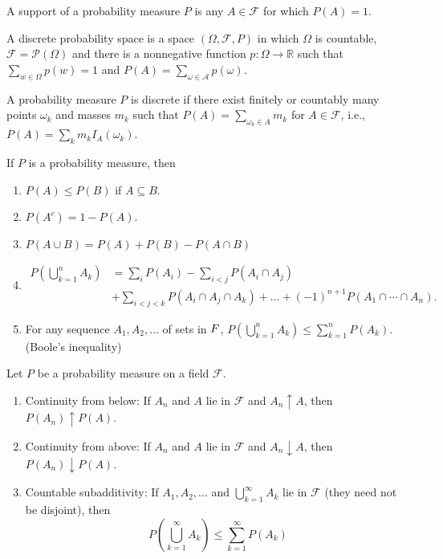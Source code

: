 \documentclass[11pt]{article}
\newcommand{\R}{\mathbb{R}}
\newcommand{\F}{\mathcal{F}}
\newcommand{\A}{\mathcal{A}}
\newcommand{\seq}{\subseteq}
\newcommand{\mc}{\mathcal}
\newcommand{\un}{\cup}
\newcommand{\ic}{\cap}
\newenvironment{theorem}[2][Theorem]{\begin{trivlist}
\item[\hskip \labelsep {\bfseries #1}\hskip \labelsep {\bfseries #2.}]}{\end{trivlist}}
\newenvironment{definition}[2][Definition]{\begin{trivlist}
\item[\hskip \labelsep {\bfseries #1}\hskip \labelsep {\bfseries #2.}]}{\end{trivlist}}
\newenvironment{rmrk}[2][Remark]{\begin{trivlist}
\item[\hskip \labelsep {\bfseries #1}\hskip \labelsep {\bfseries #2.}]}{\end{trivlist}}
\begin{document}
\begin{definition}{6}
    A support of a probability measure $P$ is any $A \in \F$ for which $P(A) = 1$.
\end{definition}

\begin{definition}{9}
    A discrete probability space is a space $(\Omega, \F, P)$ in which $\Omega$ is countable, $\F = \mc P (\Omega)$ and there is a nonnegative function $p: \Omega \to \R$ such that $\sum_{w \in \Omega} p(w) = 1$ and $P(A) = \sum_{\omega \in \A} p(\omega)$.
\end{definition}

\begin{definition}{10}
    A probability measure $P$ is discrete if there exist finitely or countably many points $\omega_k$ and masses $m_k$ such that $P(A) = \sum_{\omega_k \in A} m_k$ for $A \in \F$, i.e., $P(A) = \sum_{k} m_k I_A (\omega_k)$.
\end{definition}

\begin{rmrk}{11}
    If $P$ is a probability measure, then
    \begin{enumerate}
        \item $P(A) \leq P(B)$ if $A \seq B$.
        \item $P(A^c) = 1 - P(A)$.
        \item $P(A \un B) = P(A) + P(B) - P(A \ic B)$
        \item 
        \begin{align*}
            P\left ( \bigcup_{k=1}^{n} A_k \right) &= \sum_{i} P(A_i) - \sum_{i < j} P(A_i \ic A_j) \\
            &+ \sum_{i < j < k} P(A_i \ic A_j \ic A_k) + \ldots + (-1)^{n+1} P(A_1 \ic \cdots \ic A_n).
        \end{align*}
        \item For any sequence $A_1, A_2, \ldots$ of sets in $\mc \F$, $P( \bigcup_{k=1}^{n} A_k) \leq \sum_{k=1}^{n} P(A_k)$. (Boole's inequality)
    \end{enumerate}
\end{rmrk}

\begin{theorem}{2.1}
    Let $P$ be a probability measure on a field $\mc F$.
    \begin{enumerate}
        \item Continuity from below: If $A_n$ and $A$ lie in $\F$ and $A_n \uparrow A$, then $P(A_n) \uparrow P(A)$.
        \item Continuity from above: If $A_n$ and $A$ lie in $\F$ and $A_n \downarrow A$, then $P(A_n) \downarrow P(A)$.
        \item Countable subadditivity: If $A_1, A_2, \ldots$ and $\bigcup_{k=1}^{\infty} A_k$ lie in $\F$ (they need not be disjoint), then
        \[ P \left ( \bigcup_{k=1}^{\infty} A_k \right) \leq \sum_{k=1}^{\infty} P(A_k) \]
    \end{enumerate}
\end{theorem}
\end{document}
